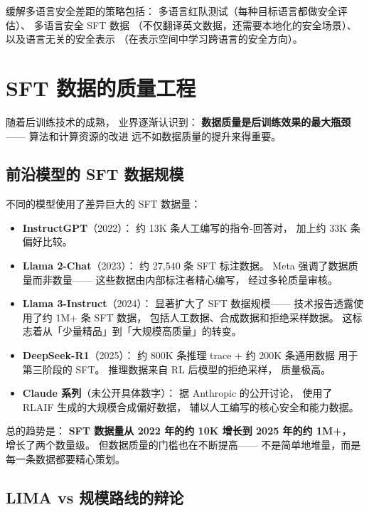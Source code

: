 缓解多语言安全差距的策略包括：
多语言红队测试（每种目标语言都做安全评估）、
多语言安全 SFT 数据
（不仅翻译英文数据，还需要本地化的安全场景）、
以及语言无关的安全表示
（在表示空间中学习跨语言的安全方向）。

\section{SFT 数据的质量工程}
\label{sec:sft-data-quality}

随着后训练技术的成熟，
业界逐渐认识到：
\textbf{数据质量是后训练效果的最大瓶颈}——
算法和计算资源的改进
远不如数据质量的提升来得重要。

\subsection{前沿模型的 SFT 数据规模}

不同的模型使用了差异巨大的 SFT 数据量：

\begin{itemize}[noitemsep]
  \item \textbf{InstructGPT}（2022）：
        约 13K 条人工编写的指令-回答对，
        加上约 33K 条偏好比较。
  \item \textbf{Llama 2-Chat}（2023）：
        约 27,540 条 SFT 标注数据。
        Meta 强调了数据质量而非数量——
        这些数据由内部标注者精心编写，
        经过多轮质量审核。
  \item \textbf{Llama 3-Instruct}（2024）：
        显著扩大了 SFT 数据规模——
        技术报告透露使用了约 1M+ 条 SFT 数据，
        包括人工数据、合成数据和拒绝采样数据。
        这标志着从「少量精品」到「大规模高质量」的转变。
  \item \textbf{DeepSeek-R1}（2025）：
        约 800K 条推理 trace + 约 200K 条通用数据
        用于第三阶段的 SFT。
        推理数据来自 RL 后模型的拒绝采样，
        质量极高。
  \item \textbf{Claude 系列}（未公开具体数字）：
        据 Anthropic 的公开讨论，
        使用了 RLAIF 生成的大规模合成偏好数据，
        辅以人工编写的核心安全和能力数据。
\end{itemize}

总的趋势是：
\textbf{SFT 数据量从 2022 年的约 10K 增长到 2025 年的约 1M+}，
增长了两个数量级。
但数据质量的门槛也在不断提高——
不是简单地堆量，而是每一条数据都要精心策划。

\subsection{LIMA vs 规模路线的辩论}


